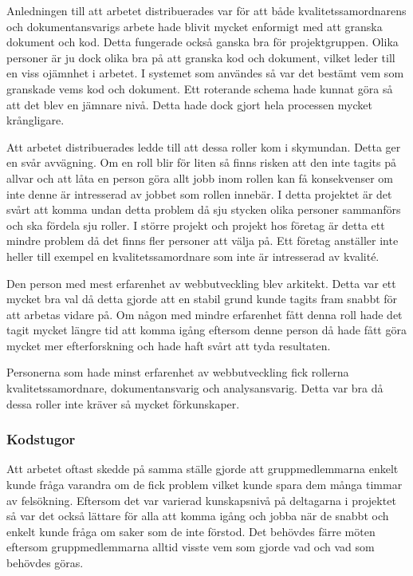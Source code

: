 \documentclass{article}
\begin{document}
Anledningen till att arbetet distribuerades var för att både kvalitetssamordnarens och dokumentansvarigs arbete hade blivit mycket enformigt med att granska dokument och kod. Detta fungerade också ganska bra för projektgruppen. Olika personer är ju dock olika bra på att granska kod och dokument, vilket leder till en viss ojämnhet i arbetet. I systemet som användes så var det bestämt vem som granskade vems kod och dokument. Ett roterande schema hade kunnat göra så att det blev en jämnare nivå. Detta hade dock gjort hela processen mycket krångligare. 

Att arbetet distribuerades ledde till att dessa roller kom i skymundan. Detta ger en svår avvägning. Om en roll blir för liten så finns risken att den inte tagits på allvar och att låta en person göra allt jobb inom rollen kan få konsekvenser om inte denne är intresserad av jobbet som rollen innebär. I detta projektet är det svårt att komma undan detta problem då sju stycken olika personer sammanförs och ska fördela sju roller. I större projekt och projekt hos företag är detta ett mindre problem då det finns fler personer att välja på. Ett företag anställer inte heller till exempel en kvalitetssamordnare som inte är intresserad av kvalité.

Den person med mest erfarenhet av webbutveckling blev arkitekt. Detta var ett mycket bra val då detta gjorde att en stabil grund kunde tagits fram snabbt för att arbetas vidare på. Om någon med mindre erfarenhet fått denna roll hade det tagit mycket längre tid att komma igång eftersom denne person då hade fått göra mycket mer efterforskning och hade haft svårt att tyda resultaten. 

Personerna som hade minst erfarenhet av webbutveckling fick rollerna kvalitetssamordnare, dokumentansvarig och analysansvarig. Detta var bra då dessa roller inte kräver så mycket förkunskaper. 


\subsubsection{Kodstugor}
Att arbetet oftast skedde på samma ställe gjorde att gruppmedlemmarna enkelt kunde fråga varandra om de fick problem vilket kunde spara dem många timmar av felsökning. Eftersom det var varierad kunskapsnivå på deltagarna i projektet så var det också lättare för alla att komma igång och jobba när de snabbt och enkelt kunde fråga om saker som de inte förstod. Det behövdes färre möten eftersom gruppmedlemmarna alltid visste vem som gjorde vad och vad som behövdes göras.
\end{document}
